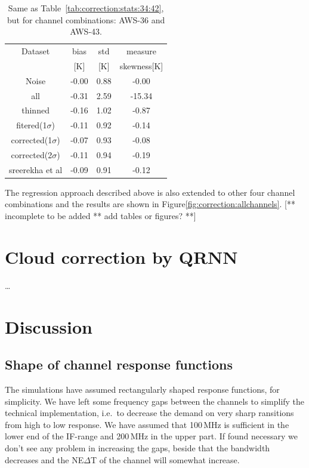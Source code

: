 \documentclass[12pt]{article}
\begin{document}
\begin{table}[!bt]
	\centering
	\begin{tabular}[b]{c|c|c|c}
		Dataset  		  &   bias &   std &   measure  \\
		&   [K]  &   [K] & skewness[K]\\
		\hline
	Noise             &  -0.00 &  0.88 &              -0.00 \\
	all               &  -0.31 &  2.59 &             -15.34 \\
	thinned           &  -0.16 &  1.02 &              -0.87 \\
	fitered(1$\sigma$)   &  -0.11 &  0.92 &              -0.14 \\
	corrected(1$\sigma$) &  -0.07 &  0.93 &              -0.08 \\
	corrected(2$\sigma$) &  -0.11 &  0.94 &              -0.19 \\
	sreerekha et al   &  -0.09 &  0.91 &              -0.12 \\

		\hline
	\end{tabular}
	\caption{Same as Table~\ref{tab:correction:stats:34:42}, but for channel combinations: AWS-36 and AWS-43.   }
	\label{tab:correction:stats:36:43}
\end{table}


The regression approach described above is also extended to other four channel combinations and the results are shown in Figure\ref{fig:correction:allchannels}.
 [** incomplete to be added ** add tables or figures? **]

\section{Cloud correction by QRNN}
%
\dots


\section{Discussion}


\subsection{Shape of channel response functions}
%
The simulations have assumed rectangularly shaped response functions, for
simplicity. We have left some frequency gaps between the channels to simplify
the technical implementation, i.e.\ to decrease the demand on very sharp
ransitions from high to low response. We have assumed that 100\,MHz is
sufficient in the lower end of the IF-range and 200\,MHz in the upper part. If
found necessary we don't see any problem in increasing the gaps, beside that
the bandwidth decreases and the NE$\Delta$T of the channel will somewhat
increase.
\end{document}
